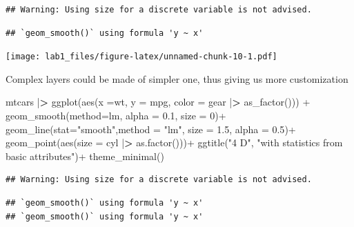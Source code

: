 \documentclass[
]{article}
\newenvironment{Shaded}{\begin{snugshade}}{\end{snugshade}}
\newcommand{\AttributeTok}[1]{\textcolor[rgb]{0.77,0.63,0.00}{#1}}
\newcommand{\DecValTok}[1]{\textcolor[rgb]{0.00,0.00,0.81}{#1}}
\newcommand{\ErrorTok}[1]{\textcolor[rgb]{0.64,0.00,0.00}{\textbf{#1}}}
\newcommand{\FloatTok}[1]{\textcolor[rgb]{0.00,0.00,0.81}{#1}}
\newcommand{\FunctionTok}[1]{\textcolor[rgb]{0.00,0.00,0.00}{#1}}
\newcommand{\NormalTok}[1]{#1}
\newcommand{\SpecialCharTok}[1]{\textcolor[rgb]{0.00,0.00,0.00}{#1}}
\newcommand{\StringTok}[1]{\textcolor[rgb]{0.31,0.60,0.02}{#1}}
\begin{document}
\begin{verbatim}
## Warning: Using size for a discrete variable is not advised.
\end{verbatim}

\begin{verbatim}
## `geom_smooth()` using formula 'y ~ x'
\end{verbatim}

\texttt{[image: lab1\_files/figure-latex/unnamed-chunk-10-1.pdf]}

Complex layers could be made of simpler one, thus giving us more
customization

\begin{Shaded}
\begin{Highlighting}[]
\NormalTok{mtcars }\SpecialCharTok{|}\ErrorTok{\textgreater{}} 
\FunctionTok{ggplot}\NormalTok{(}\FunctionTok{aes}\NormalTok{(}\AttributeTok{x =}\NormalTok{wt, }\AttributeTok{y =}\NormalTok{ mpg, }
           \AttributeTok{color =}\NormalTok{ gear }\SpecialCharTok{|}\ErrorTok{\textgreater{}} \FunctionTok{as\_factor}\NormalTok{())) }\SpecialCharTok{+}
  \FunctionTok{geom\_smooth}\NormalTok{(}\AttributeTok{method=}\StringTok{\textquotesingle{}lm\textquotesingle{}}\NormalTok{, }\AttributeTok{alpha =} \FloatTok{0.1}\NormalTok{, }\AttributeTok{size =} \DecValTok{0}\NormalTok{)}\SpecialCharTok{+}
  \FunctionTok{geom\_line}\NormalTok{(}\AttributeTok{stat=}\StringTok{"smooth"}\NormalTok{,}\AttributeTok{method =} \StringTok{"lm"}\NormalTok{, }\AttributeTok{size  =} \FloatTok{1.5}\NormalTok{, }\AttributeTok{alpha =} \FloatTok{0.5}\NormalTok{)}\SpecialCharTok{+}
  \FunctionTok{geom\_point}\NormalTok{(}\FunctionTok{aes}\NormalTok{(}\AttributeTok{size =}\NormalTok{ cyl }\SpecialCharTok{|}\ErrorTok{\textgreater{}} \FunctionTok{as.factor}\NormalTok{()))}\SpecialCharTok{+}
  \FunctionTok{ggtitle}\NormalTok{(}\StringTok{"4 D"}\NormalTok{, }\StringTok{"with statistics from basic attributes"}\NormalTok{)}\SpecialCharTok{+}
  \FunctionTok{theme\_minimal}\NormalTok{()}
\end{Highlighting}
\end{Shaded}

\begin{verbatim}
## Warning: Using size for a discrete variable is not advised.
\end{verbatim}

\begin{verbatim}
## `geom_smooth()` using formula 'y ~ x'
## `geom_smooth()` using formula 'y ~ x'
\end{verbatim}
\end{document}
